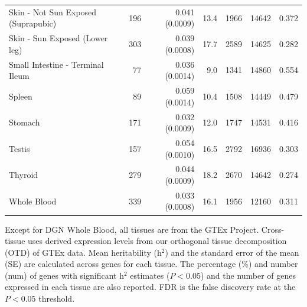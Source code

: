 \documentclass[10pt,letterpaper]{article}
\begin{document}
\begin{table}[!ht]
\begin{adjustwidth}{-2.25in}{0in}
\begin{tabular}{lrrrrrr}
  Skin - Not Sun Exposed (Suprapubic) & 196 & 0.041 (0.0009) & 13.4 & 1966 & 14642 & 0.372 \\ 
  Skin - Sun Exposed (Lower leg) & 303 & 0.039 (0.0008) & 17.7 & 2589 & 14625 & 0.282 \\ 
  Small Intestine - Terminal Ileum & 77 & 0.036 (0.0014) & 9.0 & 1341 & 14860 & 0.554 \\ 
  Spleen & 89 & 0.059 (0.0014) & 10.4 & 1508 & 14449 & 0.479 \\ 
  Stomach & 171 & 0.032 (0.0009) & 12.0 & 1747 & 14531 & 0.416 \\ 
  Testis & 157 & 0.054 (0.0010) & 16.5 & 2792 & 16936 & 0.303 \\ 
  Thyroid & 279 & 0.044 (0.0009) & 18.2 & 2670 & 14642 & 0.274 \\ 
  Whole Blood & 339 & 0.033 (0.0008) & 16.1 & 1956 & 12160 & 0.311 \\ 
   \hline
\end{tabular}
\begin{flushleft} Except for DGN Whole Blood, all tissues are from the GTEx Project. Cross-tissue uses derived expression levels from our orthogonal tissue decomposition (OTD) of GTEx data. Mean heritability (h$^2$) and the standard error of the mean (SE) are calculated across genes for each tissue. The percentage (\%) and number (num) of genes with significant h$^2$ estimates ($P<0.05$) and the number of genes expressed in each tissue are also reported. FDR is the false discovery rate at the $P<0.05$ threshold.
\end{flushleft}
\label{table-h2}
\end{adjustwidth}
\end{table}

\clearpage
\end{document}
